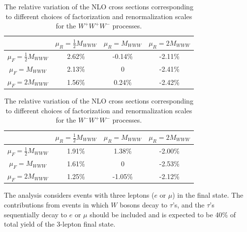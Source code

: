 \begin{table}[ht!]
    \centering
\begin{tabular}{c|c|c|c}
\hline
     & $\mu_R=\frac{1}{2}M_{WWW}$ & $\mu_R=M_{WWW}$ &  $\mu_R=2M_{WWW}$ \\
\hline
$\mu_F=\frac{1}{2}M_{WWW}$ & 2.62\% & -0.14\% & -2.11\% \\
\hline
$\mu_F=M_{WWW}$ & 2.13\% & 0 & -2.41\% \\
\hline
$\mu_F=2M_{WWW}$ & 1.56\% & 0.24\% & -2.42\% \\
\hline
\end{tabular}
\caption{The relative variation of the NLO cross sections corresponding 
to different choices of factorization and renormalization 
scales for the $W^+W^+W^-$ processes. }
\label{tab:scaleVariation1}
\end{table}


\begin{table}[ht!]
    \centering
	
\begin{tabular}{c|c|c|c}
\hline
     & $\mu_R=\frac{1}{2}M_{WWW}$ & $\mu_R=M_{WWW}$ &  $\mu_R=2M_{WWW}$ \\
\hline
$\mu_F=\frac{1}{2}M_{WWW}$ & 1.91\% & 1.38\% & -2.00\% \\
\hline
$\mu_F=M_{WWW}$ & 1.61\% & 0 & -2.53\% \\
\hline
$\mu_F=2M_{WWW}$ & 1.25\% & -1.05\% & -2.12\% \\
\hline
\end{tabular}
\caption{The relative variation of the NLO cross sections corresponding 
to different choices of factorization and renormalization 
scales for the $W^-W^+W^-$ processes. }
\label{tab:scaleVariation2}
\end{table}



The analysis considers events
with three leptons ($e$ or $\mu$) in the final state. The contributions 
from events in which $W$ bosons decay to $\tau$'s, and the $\tau$'s 
sequentially decay to $e$ or $\mu$ should be included and is expected 
to be 40\% of total yield of the 3-lepton final state.  


